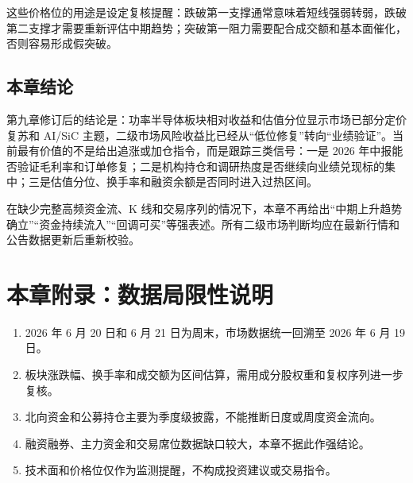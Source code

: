 这些价格位的用途是设定复核提醒：跌破第一支撑通常意味着短线强弱转弱，跌破第二支撑才需要重新评估中期趋势；突破第一阻力需要配合成交额和基本面催化，否则容易形成假突破。

\subsection{本章结论}

\begin{keyinsight}[二级市场行为核心结论]
第九章修订后的结论是：功率半导体板块相对收益和估值分位显示市场已部分定价复苏和 AI/SiC 主题，二级市场风险收益比已经从“低位修复”转向“业绩验证”。当前最有价值的不是给出追涨或加仓指令，而是跟踪三类信号：一是 2026 年中报能否验证毛利率和订单修复；二是机构持仓和调研热度是否继续向业绩兑现标的集中；三是估值分位、换手率和融资余额是否同时进入过热区间。

在缺少完整高频资金流、K 线和交易序列的情况下，本章不再给出“中期上升趋势确立”“资金持续流入”“回调可买”等强表述。所有二级市场判断均应在最新行情和公告数据更新后重新校验。
\end{keyinsight}

\section*{本章附录：数据局限性说明}

\begin{enumerate}[leftmargin=2em, topsep=0pt, itemsep=0.2em]
\item 2026 年 6 月 20 日和 6 月 21 日为周末，市场数据统一回溯至 2026 年 6 月 19 日。
\item 板块涨跌幅、换手率和成交额为区间估算，需用成分股权重和复权序列进一步复核。
\item 北向资金和公募持仓主要为季度级披露，不能推断日度或周度资金流向。
\item 融资融券、主力资金和交易席位数据缺口较大，本章不据此作强结论。
\item 技术面和价格位仅作为监测提醒，不构成投资建议或交易指令。
\end{enumerate}

